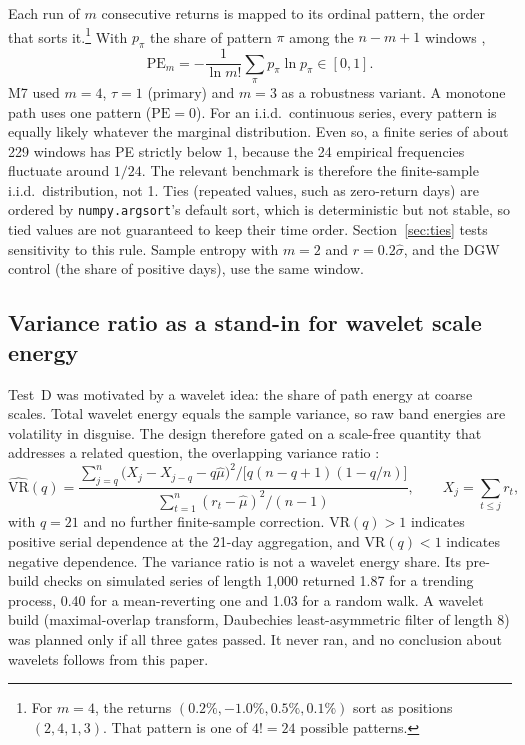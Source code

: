 \documentclass[11pt]{article}
\begin{document}
Each run of $m$ consecutive returns is mapped to its ordinal pattern, the order that sorts
it.\footnote{For $m=4$, the returns $(0.2\%, -1.0\%, 0.5\%, 0.1\%)$ sort as positions
$(2,4,1,3)$. That pattern is one of $4!=24$ possible patterns.} With $p_\pi$ the share
of pattern $\pi$ among the $n-m+1$ windows \citep{bandt2002},
\begin{equation}
  \mathrm{PE}_m=-\frac{1}{\ln m!}\sum_\pi p_\pi\ln p_\pi\in[0,1].
\end{equation}
M7 used $m=4$, $\tau=1$ (primary) and $m=3$ as a robustness variant. A monotone path uses
one pattern ($\mathrm{PE}=0$). For an i.i.d.\ continuous series, every pattern is equally
likely whatever the marginal distribution. Even so, a finite series of about 229 windows
has PE strictly below 1, because the 24 empirical frequencies fluctuate around $1/24$. The
relevant benchmark is therefore the finite-sample i.i.d.\ distribution, not 1.
Ties (repeated values, such as zero-return days) are ordered by \texttt{numpy.argsort}'s
default sort, which is deterministic but not stable, so tied values are not guaranteed to
keep their time order. Section~\ref{sec:ties} tests sensitivity to this rule. Sample entropy \citep{richman2000} with $m=2$ and
$r=0.2\hat\sigma$, and the DGW control (the share of positive days), use the same window.

\subsection{Variance ratio as a stand-in for wavelet scale energy}

Test~D was motivated by a wavelet idea: the share of path energy at coarse scales. Total
wavelet energy equals the sample variance, so raw band energies are volatility in disguise.
The design therefore gated on a scale-free quantity that addresses a related question,
the overlapping variance ratio \citep{lo1988}:
\begin{equation}
  \widehat{\mathrm{VR}}(q)=\frac{\sum_{j=q}^{n}\big(X_j-X_{j-q}-q\hat\mu\big)^2\big/\big[q(n-q+1)(1-q/n)\big]}
  {\sum_{t=1}^{n}(r_t-\hat\mu)^2/(n-1)},\qquad X_j=\sum_{t\le j}r_t,
\end{equation}
with $q=21$ and no further finite-sample correction. $\mathrm{VR}(q)>1$ indicates positive
serial dependence at the 21-day aggregation, and $\mathrm{VR}(q)<1$ indicates negative
dependence. The variance ratio is not a wavelet energy share. Its pre-build checks on
simulated series of length 1,000 returned 1.87 for a trending process, 0.40 for a
mean-reverting one and 1.03 for a random walk. A wavelet build (maximal-overlap transform,
Daubechies least-asymmetric filter of length 8) was planned only if all three gates passed.
It never ran, and no conclusion about wavelets follows from this paper.
\end{document}
